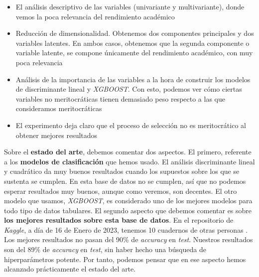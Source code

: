 \begin{itemize}
    \item El análisis descriptivo de las variables (univariante y multivariante), donde vemos la poca relevancia del rendimiento académico
    \item Reducción de dimensionalidad. Obtenemos dos componentes principales y dos variables latentes. En ambos casos, obtenemos que la segunda componente o variable latente, se compone únicamente del rendimiento académico, con muy poca relevancia
    \item Análisis de la importancia de las variables a la hora de construir los modelos de discriminante lineal y \textit{XGBOOST}. Con esto, podemos ver cómo ciertas variables no meritocráticas tienen demasiado peso respecto a las que consideramos meritocráticas
    \item El experimento deja claro que el proceso de selección no es meritocrático al obtener mejores resultados
\end{itemize}

Sobre el \textbf{estado del arte}, debemos comentar dos aspectos. El primero, referente a los \textbf{modelos de clasificación} que hemos usado. El análisis discriminante lineal y cuadrático da muy buenos resultados cuando los supuestos sobre los que se sustenta se cumplen. En esta base de datos no se cumplen, así que no podemos esperar resultados muy buenos, aunque como veremos, son decentes. El otro modelo que usamos, \textit{XGBOOST}, es considerado uno de los mejores modelos para todo tipo de datos tabulares. El segundo aspecto que debemos comentar es sobre \textbf{los mejores resultados sobre esta base de datos}. En el repositorio de \textit{Kaggle}, a día de 16 de Enero de 2023, tenemos 10 cuadernos de otras personas \footnotemark. Los mejores resultados no pasan del 90\% de \textit{accuracy} en \textit{test}. Nuestros resultados son del 89\% de \textit{accuracy} en \textit{test}, sin haber hecho una búsqueda de hiperparámetros potente. Por tanto, podemos pensar que en ese aspecto hemos alcanzado prácticamente el estado del arte.

